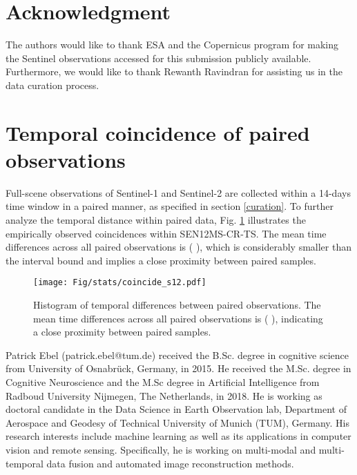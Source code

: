 \documentclass[journal]{IEEEtran}
\begin{document}
\section*{Acknowledgment}


The authors would like to thank ESA and the Copernicus program for making the Sentinel observations accessed for this submission publicly available. Furthermore, we would like to thank Rewanth Ravindran for assisting us in the data curation process. 


\ifCLASSOPTIONcaptionsoff
  \newpage
\fi

\appendices

\section{Temporal coincidence of paired observations} \label{appendix:a}

Full-scene observations of Sentinel-1 and Sentinel-2 are collected within a 14-days time window in a paired manner, as specified in section \ref{curation}. To further analyze the temporal distance within paired data, Fig. \ref{fig:temp_coincidence} illustrates the empirically observed coincidences within SEN12MS-CR-TS. The mean time differences across all paired observations is  ( ), which is considerably smaller than the interval bound and implies a close proximity between paired samples.

\begin{figure}[h!tb] \texttt{[image: Fig/stats/coincide\_s12.pdf]}
    \caption{Histogram of temporal differences between paired observations. The mean time differences across all paired observations is  ( ), indicating a close proximity between paired samples.}
    \label{fig:temp_coincidence}
\end{figure}

















\begin{IEEEbiography}{Patrick Ebel} (patrick.ebel@tum.de) received the B.Sc. degree in cognitive science from University of Osnabrück, Germany, in 2015. He received the M.Sc. degree in Cognitive Neuroscience and the M.Sc degree in Artificial Intelligence from Radboud University Nijmegen, The Netherlands, in 2018. He is working as doctoral candidate in the Data Science in Earth Observation lab, Department of Aerospace and Geodesy of Technical University of Munich (TUM), Germany. His research interests include machine learning as well as its applications in computer vision and remote sensing. Specifically, he is working on multi-modal and multi-temporal data fusion and automated image reconstruction methods. \end{IEEEbiography}
\end{document}
